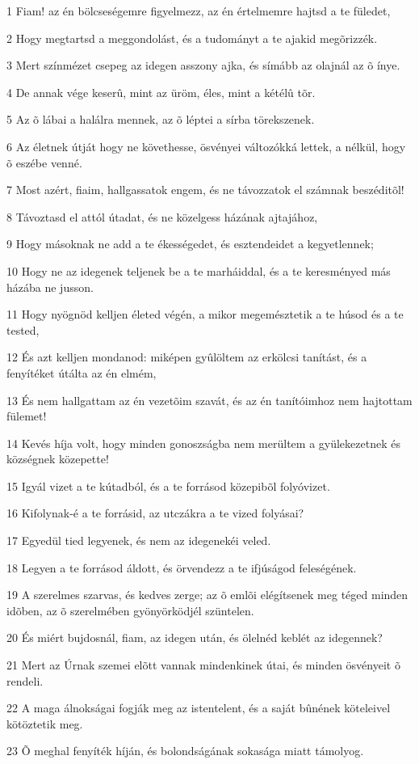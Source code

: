 \par 1 Fiam! az én bölcseségemre figyelmezz, az én értelmemre hajtsd a te füledet,
\par 2 Hogy megtartsd a meggondolást, és a tudományt a te ajakid megõrizzék.
\par 3 Mert színmézet csepeg az idegen asszony ajka, és símább az olajnál az õ ínye.
\par 4 De annak vége keserû, mint az üröm, éles, mint a kétélû tõr.
\par 5 Az õ lábai a halálra mennek, az õ léptei a sírba törekszenek.
\par 6 Az életnek útját hogy ne követhesse, ösvényei változókká lettek, a nélkül, hogy õ eszébe venné.
\par 7 Most azért, fiaim, hallgassatok engem, és ne távozzatok el számnak beszéditõl!
\par 8 Távoztasd el attól útadat, és ne közelgess házának ajtajához,
\par 9 Hogy másoknak ne add a te ékességedet, és esztendeidet a kegyetlennek;
\par 10 Hogy ne az idegenek teljenek be a te marháiddal, és a te keresményed más házába ne jusson.
\par 11 Hogy nyögnöd kelljen életed végén, a mikor megemésztetik a te húsod és a te tested,
\par 12 És azt kelljen mondanod: miképen gyûlöltem az erkölcsi tanítást, és a fenyítéket útálta az én elmém,
\par 13 És nem hallgattam az én vezetõim szavát, és az én tanítóimhoz nem hajtottam fülemet!
\par 14 Kevés híja volt, hogy minden gonoszságba nem merültem a gyülekezetnek és községnek közepette!
\par 15 Igyál vizet a te kútadból, és a te forrásod közepibõl folyóvizet.
\par 16 Kifolynak-é a te forrásid, az utczákra a te vized folyásai?
\par 17 Egyedül tied legyenek, és nem az idegenekéi veled.
\par 18 Legyen a te forrásod áldott, és örvendezz a te ifjúságod feleségének.
\par 19 A szerelmes szarvas, és kedves zerge; az õ emlõi elégítsenek meg téged minden idõben, az õ szerelmében gyönyörködjél szüntelen.
\par 20 És miért bujdosnál, fiam, az idegen után, és ölelnéd keblét az idegennek?
\par 21 Mert az Úrnak szemei elõtt vannak mindenkinek útai, és minden ösvényeit õ  rendeli.
\par 22 A maga álnokságai fogják meg az istentelent, és a saját bûnének köteleivel kötöztetik meg.
\par 23 Õ meghal fenyíték híján, és bolondságának sokasága miatt támolyog.

